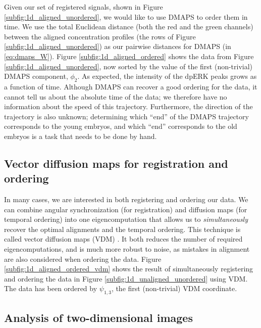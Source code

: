 \documentclass{pnastwo}
\begin{document}
\begin{article}
Given our set of registered signals, shown in Figure \ref{subfig:1d_aligned_unordered}, we would like to use DMAPS to order them in time.
%
We use the total Euclidean distance (both the red and the green channels) between the aligned concentration profiles (the rows of Figure \ref{subfig:1d_aligned_unordered}) as our pairwise distances for DMAPS (in \eqref{eq:dmaps_W}).
%
Figure \ref{subfig:1d_aligned_ordered} shows the data from Figure \ref{subfig:1d_aligned_unordered}, now sorted by the value of the first (non-trivial) DMAPS component, $\phi_2$. 
%
As expected, the intensity of the dpERK peaks grows as a function of time. 
%
Although DMAPS can recover a good ordering for the data, it cannot tell us about the absolute time of the data; we therefore have no information about the speed of this trajectory.
%
Furthermore, the direction of the trajectory is also unknown; determining which ``end'' of the DMAPS trajectory corresponds to the young embryos, and which ``end'' corresponds to the old embryos is a task that needs to be done by hand.

\subsection{Vector diffusion maps for registration and ordering}

In many cases, we are interested in both registering and ordering our data.
%
%
We can combine angular synchronization (for registration) and diffusion maps (for temporal ordering) into one eigencomputation that allows us to {\em simultaneously} recover the optimal alignments and the temporal ordering.
%
This technique is called vector diffusion maps (VDM) \cite{singer2012vector}.
%
It both reduces the number of required eigencomputations, and is much more robust to noise, as mistakes in alignment are also considered when ordering the data.
%
Figure \ref{subfig:1d_aligned_ordered_vdm} shows the result of simultaneously registering and ordering the data in Figure \ref{subfig:1d_unaligned_unordered} using VDM. 
%
The data has been ordered by $\psi_{1, 3}$, the first (non-trivial) VDM coordinate. 

\subsection{Analysis of two-dimensional images}


\end{article}
\end{document}
